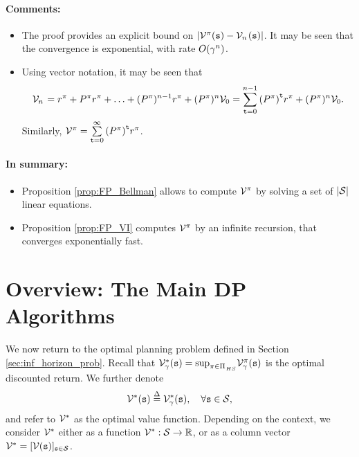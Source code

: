 \paragraph{Comments:}
\begin{itemize}
  \item The proof provides an explicit bound on $|{\mathcal{V}^\pi }({\tt s}) - {\mathcal{V}_n}{\kern 1pt} ({\tt s})|$. It may be seen that the convergence is exponential, with rate $O({\gamma ^n})$.
  \item Using vector notation, it may be seen that
          \[{\mathcal{V}_n}{\kern 1pt}  = {r^\pi } + {P^\pi }{r^\pi } +  \ldots  + {({P^\pi })^{n - 1}}{r^\pi } + {({P^\pi })^n}{\mathcal{V}_0} = \sum\limits_{{\tt t} = 0}^{n - 1} {{{({P^\pi })}^{\tt t}}{r^\pi }}  + {({P^\pi })^n}{\mathcal{V}_0}.\]
Similarly,    ${\mathcal{V}^\pi } = \sum\limits_{{\tt t} = 0}^\infty
{{{({P^\pi})}^{\tt t}}{r^\pi}}$.
\end{itemize}

\paragraph{In summary:}
\begin{itemize}
  \item Proposition \ref{prop:FP_Bellman} allows to compute $\mathcal{V}_{}^\pi $ by solving a set of $|\mathcal{S}|$ linear equations.
  \item Proposition \ref{prop:FP_VI} computes $\mathcal{V}_{}^\pi $ by an infinite recursion, that converges exponentially fast.
\end{itemize}

\section{Overview: The Main DP Algorithms}

We now return to the optimal planning problem defined in Section
\ref{sec:inf_horizon_prob}. Recall that  $\mathcal{V}_\gamma
^*({\tt s}) = {\sup _{\pi  \in \Pi }}_{_{HS}}\mathcal{V}_\gamma
^\pi ({\tt s})$ is the optimal discounted return. We further
denote
\[{\Value^*}(\state) \buildrel \Delta \over = \Value_\discount ^*(\state),    \quad  \forall \state \in \States,\]
and refer to ${\mathcal{V}^*}$ as the optimal value function. Depending
on the context, we consider ${\mathcal{V}^*}$ either as a function
$\mathcal{V}^* : \mathcal{S} \to \mathbb R$, or as a column vector
${\mathcal{V}^*} = {[\mathcal{V}({\tt s})]_{{\tt s} \in \mathcal{S}}}$.

